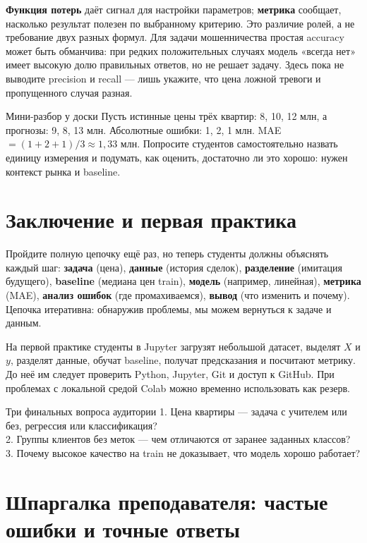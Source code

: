 \documentclass[11pt,a4paper]{article}
\newcommand{\term}[1]{\textbf{\color{navy}#1}}
\begin{document}
\term{Функция потерь} даёт сигнал для настройки параметров; \term{метрика} сообщает, насколько результат полезен по выбранному критерию. Это различие ролей, а не требование двух разных формул. Для задачи мошенничества простая accuracy может быть обманчива: при редких положительных случаях модель «всегда нет» имеет высокую долю правильных ответов, но не решает задачу. Здесь пока не выводите precision и recall --- лишь укажите, что цена ложной тревоги и пропущенного случая разная.

\begin{saybox}{Мини-разбор у доски}
Пусть истинные цены трёх квартир: 8, 10, 12 млн, а прогнозы: 9, 8, 13 млн. Абсолютные ошибки: 1, 2, 1 млн. MAE $=(1+2+1)/3\approx1{,}33$ млн. Попросите студентов самостоятельно назвать единицу измерения и подумать, как оценить, достаточно ли это хорошо: нужен контекст рынка и baseline.
\end{saybox}

\section{Заключение и первая практика}



Пройдите полную цепочку ещё раз, но теперь студенты должны объяснять каждый шаг: \textbf{задача} (цена), \textbf{данные} (история сделок), \textbf{разделение} (имитация будущего), \textbf{baseline} (медиана цен train), \textbf{модель} (например, линейная), \textbf{метрика} (MAE), \textbf{анализ ошибок} (где промахиваемся), \textbf{вывод} (что изменить и почему). Цепочка итеративна: обнаружив проблемы, мы можем вернуться к задаче и данным.

На первой практике студенты в Jupyter загрузят небольшой датасет, выделят $X$ и $y$, разделят данные, обучат baseline, получат предсказания и посчитают метрику. До неё им следует проверить Python, Jupyter, Git и доступ к GitHub. При проблемах с локальной средой Colab можно временно использовать как резерв.

\begin{saybox}{Три финальных вопроса аудитории}
1. Цена квартиры --- задача с учителем или без, регрессия или классификация?\\
2. Группы клиентов без меток --- чем отличаются от заранее заданных классов?\\
3. Почему высокое качество на train не доказывает, что модель хорошо работает?
\end{saybox}

\section{Шпаргалка преподавателя: частые ошибки и точные ответы}
\end{document}
